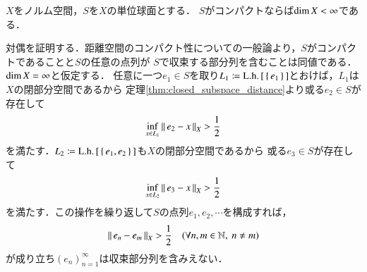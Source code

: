 	\begin{prf}
		
	\end{prf}
	
	\begin{screen}
		\begin{thm}[単位球面がコンパクトなら有限次元]
			$X$をノルム空間，$S$を$X$の単位球面とする．
			$S$がコンパクトならば$\operatorname{dim} X < \infty$である．
			\label{thm:normed_space_unit_sphere_compact_finite_dimension}
		\end{thm}
	\end{screen}
	
	\begin{prf}
		対偶を証明する．距離空間のコンパクト性についての一般論より，$S$がコンパクトであることと$S$の任意の点列が
		$S$で収束する部分列を含むことは同値である．$\operatorname{dim} X = \infty$と仮定する．
		任意に一つ$e_1 \in S$を取り$L_1 \coloneqq \mathrm{L.h.}\left[\, \{\, e_1\, \}\, \right]$とおけば，$L_1$は$X$の閉部分空間であるから
		定理\ref{thm:closed_subspace_distance}より或る$e_2 \in S$が存在して
		\begin{align}
			\operatorname*{inf}_{x \in L_1} \left\|\, e_2 - x\, \right\|_{X} > \frac{1}{2}
		\end{align}
		を満たす．$L_2 \coloneqq \mathrm{L.h.}\left[\, \{\, e_1,e_2\, \}\, \right]$も$X$の閉部分空間であるから
		或る$e_3 \in S$が存在して
		\begin{align}
			\operatorname*{inf}_{x \in L_2} \left\|\, e_3 - x\, \right\|_{X} > \frac{1}{2}
		\end{align}
		を満たす．この操作を繰り返して$S$の点列$e_1,e_2,\cdots$を構成すれば，
		\begin{align}
			\left\|\, e_n - e_m\, \right\|_{X} > \frac{1}{2} \quad (\forall n,m \in \mathbb{N},\ n \neq m)
		\end{align}
		が成り立ち$\left( e_n \right)_{n=1}^{\infty}$は収束部分列を含みえない．
		\QED
	\end{prf}